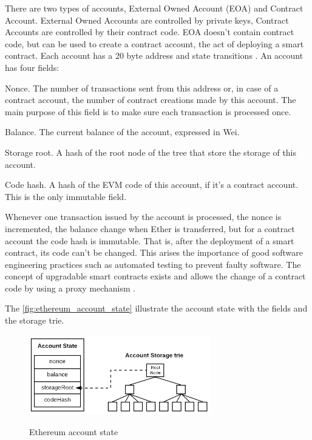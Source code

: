 \documentclass[
    article, 
    12pt,				%
	oneside,			%
	a4paper,			%
	chapter=TITLE,		%
	section=TITLE,		%
	english,			%
	english,				%
	sumario=tradicional
]{abntex2}
\begin{document}
There are two types of accounts, External Owned Account (EOA) and Contract Account.
External Owned Accounts are controlled by private keys, Contract Accounts are controlled by their contract code.
EOA doesn't contain contract code, but can be used to create a contract account, the act of deploying a smart contract.
Each account has a 20 byte address and state transitions \cite{wood_ethereum_2021}. 
An account has four fields:

\begin{alineas}
    \item Nonce. 
    The number of transactions sent from this address or, in case of a contract account, the number of contract creations made by this account.
    The main purpose of this field is to make sure each transaction is processed once. 
    
    \item Balance. 
    The current balance of the account, expressed in Wei.
    
    \item Storage root.
    A hash of the root node of the tree that store the storage of this account.
    
    \item Code hash.
    A hash of the EVM code of this account, if it's a contract account.
    This is the only immutable field.
\end{alineas}

Whenever one transaction issued by the account is processed, the nonce is incremented, the balance change when Ether is transferred, but for a contract account the code hash is immutable.
That is, after the deployment of a smart contract, its code can't be changed.
This arises the importance of good software engineering practices such as automated testing to prevent faulty software.
The concept of upgradable smart contracts exists and allows the change of a contract code by using a proxy mechanism \cite{openzeppelin_proxy_upgrade}.

The \autoref{fig:ethereum_account_state} illustrate the account state with the fields and the storage trie.

\begin{figure}[ht]
    \centering
    \caption{Ethereum account state}
    \includegraphics[width=300px]{images/Account-state.png}
    \label{fig:ethereum_account_state}
\end{figure}
\end{document}
